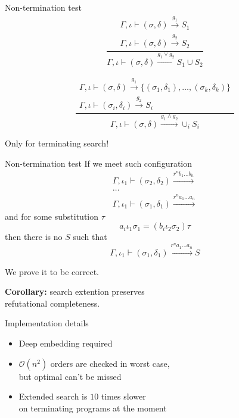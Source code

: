 \documentclass[final,20pt]{beamer}
\begin{document}
\begin{frame}[t]
\begin{columns}[t]
\begin{column}{\onecolwid}
\begin{block}{Non-termination test}
      \[ \frac{ \begin{array}{c} \Gamma, \iota \vdash (\sigma, \delta) \xrightarrow{ g_1 } S_1 \\ \Gamma, \iota \vdash (\sigma, \delta) \xrightarrow{ g_2 } S_2 \end{array}}{ \Gamma, \iota \vdash (\sigma, \delta) \xrightarrow{ g_1 \vee g_2 } S_1 \cup S_2 } \]
      
      \[ \frac{ \begin{array}{c} \Gamma, \iota \vdash (\sigma, \delta) \xrightarrow{ g_1 } \{ (\sigma_1, \delta_1), \dots, (\sigma_k, \delta_k) \} \\ \Gamma, \iota \vdash (\sigma_i, \delta_i) \xrightarrow{ g_2 } S_i \end{array}}{ \Gamma, \iota \vdash (\sigma, \delta) \xrightarrow{ g_1 \wedge g_2 } \cup_i S_i } \]

      \begin{center} Only for terminating search! \end{center}
      \begin{exampleblock}{Non-termination test}
        If we meet such configuration
        \[
          \begin{array}{c}
            \Gamma, \iota_1 \vdash (\sigma_2, \delta_2) \xrightarrow{r^n b_1 \dots b_n} \\
            \ldots \\
            \Gamma, \iota_1 \vdash (\sigma_1, \delta_1) \xrightarrow{r^n a_1 \dots a_n}
          \end{array}
        \]
        and for some substitution $\tau$
        \[ a_i \iota_1 \sigma_1 = (b_i \iota_2 \sigma_2) \tau \]
        then there is no $S$ such that
        \[ \Gamma, \iota_1 \vdash (\sigma_1, \delta_1) \xrightarrow{r^n a_1 \dots a_n} S \]
      \end{exampleblock}
      We prove it to be correct.
      
      \textbf{Corollary:} search extention preserves \\ refutational completeness.
    \end{block}
    
    \begin{block}{Implementation details}
      \begin{itemize}
        \item Deep embedding required
        \item $\mathcal{O}(n^2)$ orders are checked in worst case, \\ but optimal can't be missed
        \item Extended search is $10$ times slower \\ on terminating programs at the moment
      \end{itemize}
    \end{block}
    

\end{column}
\end{columns}
\end{frame}
\end{document}
